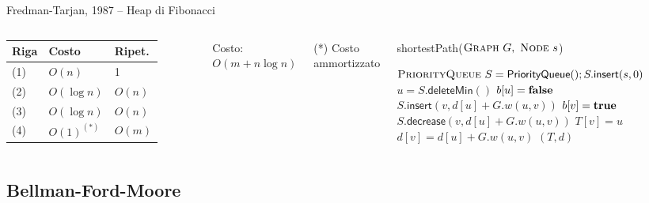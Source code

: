 \begin{frame}{Fredman-Tarjan, 1987 -- Heap di Fibonacci}



\begin{columns}

\begingroup
\renewcommand*{\arraystretch}{1.2}
\begin{tabular}{|l|l|l|}
\hline
Riga & Costo & Ripet. \\\hline
(1) & $O(n)$ & 1 \\\hline
(2) & $O(\log n)$ & $O(n)$ \\\hline
(3) & $O(\log n)$ & $O(n)$ \\\hline
(4) & $O(1)^{(*)}$ & $O(m)$ \\\hline
\end{tabular}
\endgroup

\medskip
Costo: \alert{$O(m + n \log n)$}

\medskip
(*) Costo ammortizzato

\vspace{-12pt}
\tiny
\begin{Procedure}
\caption[A]{\textsf{shortestPath}($\textsc{Graph}\ G,\ \textsc{Node}\ s$)}
\alert{$\textsc{PriorityQueue}\ S = \textsf{PriorityQueue}(); S.\textsf{insert}(s, 0)$}\;
{
  \alert{$u = S.\textsf{deleteMin}()$}\;
  $b[u] = \FALSE$\;
  {
    {
      {
        \alert{$S.\textsf{insert}(v, d[u]+G.w(u,v))$}\;
        $b[v] = \TRUE$\;
      }
      {
        \alert{$S.\textsf{decrease}(v, d[u]+G.w(u,v))$}
      }
      $T[v] = u$\;
      $d[v] = d[u] + G.w(u,v)$\;
    }
  }
}
\Return $(T,d)$
\end{Procedure}
\end{columns}

\end{frame}

\subsection{Bellman-Ford-Moore}


